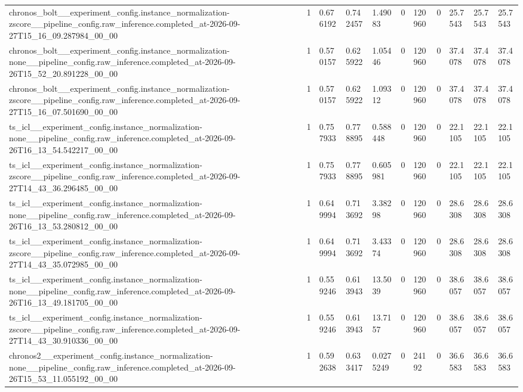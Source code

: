 \begin{tabular}{lllllllllll}
chronos\_bolt\_\_experiment\_config.instance\_normalization-zscore\_\_pipeline\_config.raw\_inference.completed\_at-2026-09-27T15\_16\_09.287984\_00\_00 & 1 & 0.676192 & 0.742457 & 1.49083 & 0 & 120960 & 0 & 25.7543 & 25.7543 & 25.7543 \\
chronos\_bolt\_\_experiment\_config.instance\_normalization-none\_\_pipeline\_config.raw\_inference.completed\_at-2026-09-26T15\_52\_20.891228\_00\_00 & 1 & 0.570157 & 0.625922 & 1.05446 & 0 & 120960 & 0 & 37.4078 & 37.4078 & 37.4078 \\
chronos\_bolt\_\_experiment\_config.instance\_normalization-zscore\_\_pipeline\_config.raw\_inference.completed\_at-2026-09-27T15\_16\_07.501690\_00\_00 & 1 & 0.570157 & 0.625922 & 1.09312 & 0 & 120960 & 0 & 37.4078 & 37.4078 & 37.4078 \\
ts\_icl\_\_experiment\_config.instance\_normalization-none\_\_pipeline\_config.raw\_inference.completed\_at-2026-09-26T16\_13\_54.542217\_00\_00 & 1 & 0.757933 & 0.778895 & 0.588448 & 0 & 120960 & 0 & 22.1105 & 22.1105 & 22.1105 \\
ts\_icl\_\_experiment\_config.instance\_normalization-zscore\_\_pipeline\_config.raw\_inference.completed\_at-2026-09-27T14\_43\_36.296485\_00\_00 & 1 & 0.757933 & 0.778895 & 0.605981 & 0 & 120960 & 0 & 22.1105 & 22.1105 & 22.1105 \\
ts\_icl\_\_experiment\_config.instance\_normalization-none\_\_pipeline\_config.raw\_inference.completed\_at-2026-09-26T16\_13\_53.280812\_00\_00 & 1 & 0.649994 & 0.713692 & 3.38298 & 0 & 120960 & 0 & 28.6308 & 28.6308 & 28.6308 \\
ts\_icl\_\_experiment\_config.instance\_normalization-zscore\_\_pipeline\_config.raw\_inference.completed\_at-2026-09-27T14\_43\_35.072985\_00\_00 & 1 & 0.649994 & 0.713692 & 3.43374 & 0 & 120960 & 0 & 28.6308 & 28.6308 & 28.6308 \\
ts\_icl\_\_experiment\_config.instance\_normalization-none\_\_pipeline\_config.raw\_inference.completed\_at-2026-09-26T16\_13\_49.181705\_00\_00 & 1 & 0.559246 & 0.613943 & 13.5039 & 0 & 120960 & 0 & 38.6057 & 38.6057 & 38.6057 \\
ts\_icl\_\_experiment\_config.instance\_normalization-zscore\_\_pipeline\_config.raw\_inference.completed\_at-2026-09-27T14\_43\_30.910336\_00\_00 & 1 & 0.559246 & 0.613943 & 13.7157 & 0 & 120960 & 0 & 38.6057 & 38.6057 & 38.6057 \\
chronos2\_\_experiment\_config.instance\_normalization-none\_\_pipeline\_config.raw\_inference.completed\_at-2026-09-26T15\_53\_11.055192\_00\_00 & 1 & 0.592638 & 0.633417 & 0.0275249 & 0 & 24192 & 0 & 36.6583 & 36.6583 & 36.6583 \\

\end{tabular}
